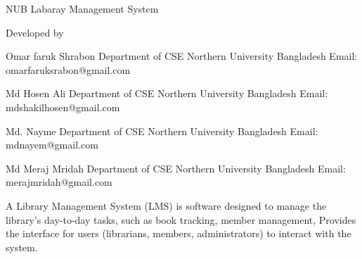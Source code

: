  NUB Labaray Management System

                                        Developed by 

                                   Omar faruk Shrabon
                                   Department of CSE 
                      Northern University Bangladesh
                   Email: omarfaruksrabon@gmail.com

                                        Md Hosen Ali 
                                   Department of CSE 
                     Northern University Bangladesh
                     Email: mdshakilhosen@gmail.com

                                          Md. Nayme
                                   Department of CSE 
                     Northern University Bangladesh
                           Email: mdnayem@gmail.com

                                    Md Meraj Mridah
                                   Department of CSE 
                     Northern University Bangladesh
                       Email: merajmridah@gmail.com

        A Library Management System (LMS) is software
        designed to manage the library's day-to-day
     tasks, such as book tracking, member management,
    Provides the interface for users (librarians,
members, administrators) to interact with the system.
